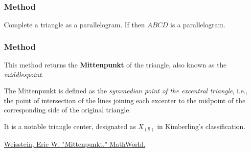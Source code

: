 
\subsubsection{Method } %
\label{ssub:method_triangle_parallelogram}
Complete a triangle as a parallelogram. If  then  $ABCD$ is a parallelogram.



\subsubsection{Method } %
\label{ssub:method_triangle_mittenpunkt}

This method returns the \textbf{Mittenpunkt} of the triangle, also known as the \emph{middlespoint}.

\medskip
\noindent
The Mittenpunkt is defined as the \emph{symmedian point of the excentral triangle}, i.e., the point of intersection of the lines joining each excenter to the midpoint of the corresponding side of the original triangle.

\medskip
\noindent
It is a notable triangle center, designated as $X_{(9)}$ in Kimberling’s classification.

\begin{flushright}
\small
\href{https://mathworld.wolfram.com/Mittenpunkt.html}{Weisstein, Eric W. "Mittenpunkt." MathWorld.}
\end{flushright}

\vspace{1em}


